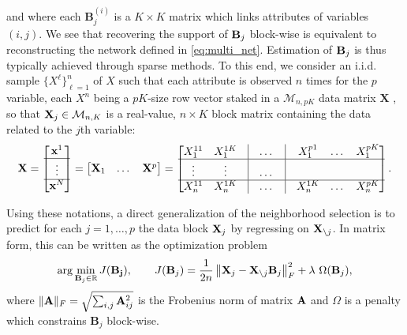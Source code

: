 and  where each  $\mathbf{B}_j^{(i)}$ is  a $K\times  K$ matrix  which
links attributes  of variables  $(i,j)$.  We  see that  recovering the
support of $\mathbf{B}_j$ block-wise is equivalent to reconstructing the network
defined  in  \eqref{eq:multi_net}.  Estimation   of  $\mathbf{B}_j$  is  thus
typically achieved through  sparse methods.  To this  end, we consider
an  i.i.d.   sample  $\{X^\ell\}_{\ell=1}^n$  of $X$  such  that  each
attribute is observed $n$ times for the $p$ variable, each $X^n$ being
a $pK$-size  row vector staked  in a $\mathcal{M}_{n,pK}$  data matrix
$\mathbf{X}$ , so that $\mathbf{X}_j  \in \mathcal{M}_{n,K}$ is a real-value,
$n \times  K$ block  matrix containing  the data  related to  the $j$th
variable:
\begin{multline*}
  \mathbf{X} = \begin{bmatrix}
    \mathbf{x}^1 \\ \hline
    \vdots \\\hline
    \mathbf{x}^N \\
  \end{bmatrix}
  = \begin{bmatrix}
    \mathbf{X}_1 & \dots & \mathbf{X}^p \\
  \end{bmatrix} 
  = \begin{bmatrix}
    X^{11}_1 & X^{1K}_1 & \vline & \dots & \vline & X^{p1}_1 & \dots & X^{pK}_1 \\ \hline
    \vdots & \vdots & \vline & \dots & \vline & & & \\ \hline
    X^{11}_n & X^{1K}_n & \vline & \dots & \vline & X^{1K}_n & \dots & X^{pK}_n \\ 
  \end{bmatrix}.
\end{multline*}

Using  these notations,  a direct  generalization of  the neighborhood
selection is to  predict for each $j=1,\dots,p$ the  data block $\mathbf{X}_j$
by regressing  on $\mathbf{X}_{\backslash  j}$. In matrix  form, this  can be
written as the optimization problem
\begin{equation}
  \label{eq:multi_penalized}
  \arg  \min_{\bB_j  \in  \mathbb{R}}  J(\mathbf{B_j}),  \qquad
  J(\bB_j) = \frac{1}{2n} \left\|
    \bX_j - \bX_{\backslash j}\bB_j\right\|_F^2 +
  \lambda \ \Omega(\bB_j),
\end{equation}
where $\|\mathbf{A}\|_F = \sqrt{\sum_{i,j} \mathbf{A}_{ij}^2}$ is the Frobenius norm
of  matrix   $\mathbf{A}$  and  $\Omega$   is  a  penalty   which  constrains
$\mathbf{B}_j$ block-wise.

